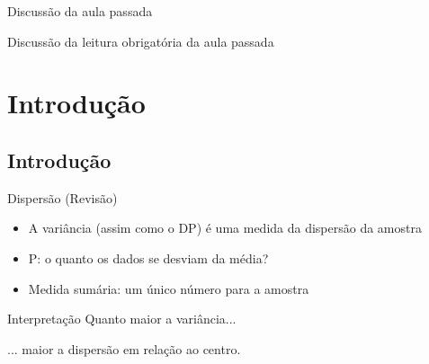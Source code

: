 \documentclass{beamer}
\begin{document}

\begin{frame}{\scriptsize Discussão da aula passada}
  \begin{block}{}
    \footnotesize
    Discussão da leitura obrigatória da aula passada
  \end{block}
\end{frame}

\section{Introdução}

\subsection[Intro]{Introdução}

\begin{frame}{\scriptsize Dispersão (Revisão)}
  \begin{itemize}
    \footnotesize
  \item A variância (assim como o DP) é uma medida da dispersão da
    amostra
  \item P: o quanto os dados se desviam da média?
  \item Medida sumária: um único número para a amostra
  \end{itemize}
  \bigskip
  \begin{block}{Interpretação}
    \footnotesize
    \small
    Quanto maior a variância...

    \bigskip
    ... maior a dispersão em relação ao centro.
  \end{block}
\end{frame}
\end{document}
